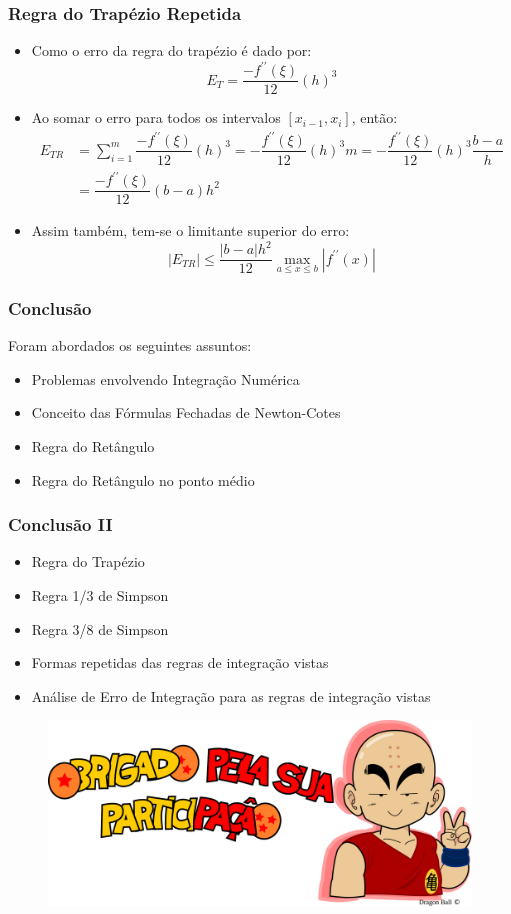 \documentclass{beamer}
\theoremstyle{mystyle}
\begin{document}
\begin{frame}
	\frametitle{Regra do Trapézio Repetida}
	\begin{itemize}
		\item Como o erro da regra do trapézio é dado por:
		\begin{equation*}
			E_{T} = \dfrac{-f^{\prime\prime}(\xi)}{12}(h)^{3}
		\end{equation*}
		\item Ao somar o erro para todos os intervalos $ [x_{i-1}, x_{i}] $, então:
		\begin{align*}
			E_{TR} &= \sum_{i=1}^{m}\dfrac{-f^{\prime\prime}(\xi)}{12}(h)^{3} = -\dfrac{f^{\prime\prime}(\xi)}{12}(h)^{3}m = -\dfrac{f^{\prime\prime}(\xi)}{12}(h)^{3}\dfrac{b - a}{h}\\
			&= \dfrac{-f^{\prime\prime}(\xi)}{12}(b - a)h^{2}
		\end{align*}
		\item Assim também, tem-se o limitante superior do erro:
		\begin{equation*}
			|E_{TR}| \leq \dfrac{|b - a|h^{2}}{12}\max_{a \leq x \leq b}|f^{\prime\prime}(x)|
		\end{equation*}
	\end{itemize}
\end{frame}


\begin{frame}
	\frametitle{Conclusão}	
	Foram abordados os seguintes assuntos:
	\begin{itemize}
		\item Problemas envolvendo Integração Numérica
		\item Conceito das Fórmulas Fechadas de Newton-Cotes
		\item Regra do Retângulo
		\item Regra do Retângulo no ponto médio
	\end{itemize}
\end{frame}

\begin{frame}
	\frametitle{Conclusão II}	
	\begin{itemize}
		\item Regra do Trapézio
		\item Regra 1/3 de Simpson
		\item Regra 3/8 de Simpson
		\item Formas repetidas das regras de integração vistas
		\item Análise de Erro de Integração para as regras de integração vistas
	\end{itemize}
\end{frame}

\begin{frame}[plain]
\bigskip
\bigskip
\bigskip
\bigskip
\bigskip
\begin{figure}
	\centering
	\includegraphics[width=0.9\linewidth]{../krillin_v}
	\label{fig:luffyv}
\end{figure}
\end{frame}
\end{document}
